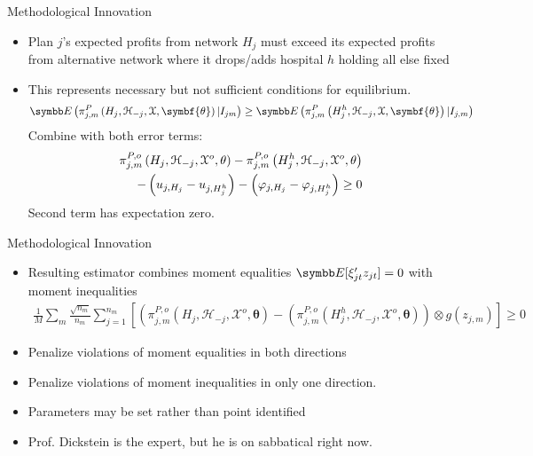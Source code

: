\documentclass[aspectratio=169,10pt]{beamer}
\begin{document}
\begin{frame}{Methodological Innovation}
\begin{itemize}
\item Plan $j$'s expected profits from network $H_j$ must exceed its expected profits from alternative network where it drops/adds hospital $h$ holding all else fixed
\item This represents \alert{necessary} but \alert{not sufficient} conditions for equilibrium.
\begin{align*}
\E\left(\pi_{j, m}^{P}\left(H_{j}, \mathcal{H}_{-j}, \mathcal{X}, \symbf{\theta}\right) | I_{j m}\right) \geq \E\left(\pi_{j, m}^{P}\left(H_{j}^{h}, \mathcal{H}_{-j}, \mathcal{X}, \symbf{\theta}\right) | I_{j, m}\right)
\end{align*}
Combine with both error terms:
\begin{align*}
\small
\pi_{j, m}^{P, o}\left(H_{j}, \mathcal{H}_{-j}, \mathcal{X}^{o}, \theta\right)-\pi_{j, m}^{P, o}\left(H_{j}^{h}, \mathcal{H}_{-j}, \mathcal{X}^{o}, \theta\right)\\
-\left(u_{j, H_{j}}-u_{j, H_{j}^{h}}\right)-\left(\varphi_{j, H_{j}}-\varphi_{j, H_{j}^{h}}\right) \geq 0
\end{align*}
Second term has expectation zero.
\end{itemize}
\end{frame}

\begin{frame}{Methodological Innovation}
\begin{itemize}
\item Resulting estimator combines \alert{moment equalities } $\E[\xi_{jt}' z_{jt}]=0$ with \alert{moment inequalities}
\begin{align*}
\frac{1}{M} \sum_{m} \frac{\sqrt{n_{m}}}{n_{m}} \sum_{j=1}^{n_{m}}\left[\left(\pi_{j, m}^{P, o}\left(H_{j}, \mathcal{H}_{-j}, \mathcal{X}^{o}, \symbf{\theta}\right)-\left(\pi_{j, m}^{P, o}\left(H_{j}^{h}, \mathcal{H}_{-j}, \mathcal{X}^{o}, \symbf{\theta}\right)\right) \otimes g\left(z_{j, m}\right)\right] \geq 0\right.
\end{align*}
\item Penalize violations of moment equalities in both directions
\item Penalize violations of moment inequalities in only one direction.
\item Parameters may be \alert{set} rather than \alert{point identified}
\item Prof. Dickstein is the expert, but he is on sabbatical right now.
\end{itemize}
\end{frame}
\end{document}
